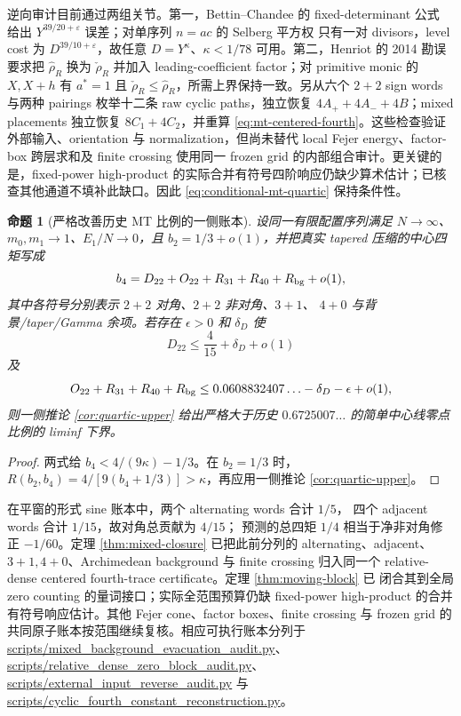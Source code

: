\documentclass[UTF8,11pt,a4paper]{ctexart}
\newtheorem{proposition}[theorem]{命题}
\theoremstyle{definition}
\theoremstyle{remark}
\newcommand{\eps}{\varepsilon}
\begin{document}
逆向审计目前通过两组关节。第一，Bettin--Chandee \cite[Corollary~1]{BettinChandee} 的 fixed-determinant
公式 给出 $Y^{39/20+\eps}$ 误差；对单序列 $n=ac$ 的 Selberg 平方权
只有一对 divisors，level cost 为 $D^{39/10+\eps}$，故任意
$D=Y^\kappa$、$\kappa<1/78$ 可用。第二，Henriot \cite{Henriot} 的 2014 勘误要求把
$\widehat\rho_R$ 换为 $\check\rho_R$ 并加入 leading-coefficient factor；对
primitive monic 的 $X,X+h$ 有 $a^*=1$ 且
$\check\rho_R\le\widehat\rho_R$，所需上界保持一致。另从六个 $2+2$ sign
words 与两种 pairings 枚举十二条 raw cyclic paths，独立恢复
$4A_++4A_-+4B$；mixed placements 独立恢复 $8C_1+4C_2$，并重算
\eqref{eq:mt-centered-fourth}。这些检查验证外部输入、orientation 与
normalization，但尚未替代 local Fejer energy、factor-box 跨层求和及 finite
crossing 使用同一 frozen grid 的内部组合审计。更关键的是，fixed-power high-product
的实际合并有符号四阶响应仍缺少算术估计；已核查其他通道不填补此缺口。因此
\eqref{eq:conditional-mt-quartic} 保持条件性。
\begin{proposition}[严格改善历史 MT 比例的一侧账本]\label{prop:fourth-ledger}
设同一有限配置序列满足 $N\to\infty$、$m_0,m_1\to1$、$E_1/N\to0$，且 $b_2=1/3+o(1)$，并把真实 tapered 压缩的中心四矩写成
\[
 b_4=D_{22}+O_{22}+R_{31}+R_{40}+R_{\rm bg}+o(1),
\]
其中各符号分别表示 $2+2$ 对角、$2+2$ 非对角、$3+1$、
$4+0$ 与背景/taper/Gamma 余项。若存在 $\epsilon>0$ 和 $\delta_D$ 使
\[
 D_{22}\le\frac4{15}+\delta_D+o(1)
\]
及
\[
 O_{22}+R_{31}+R_{40}+R_{\rm bg}
 \le0.0608832407\ldots-\delta_D-\epsilon+o(1),
\]
则一侧推论 \ref{cor:quartic-upper} 给出严格大于历史
$0.6725007\ldots$ 的简单中心线零点比例的 liminf 下界。
\end{proposition}

\begin{proof}
两式给
$b_4<4/(9\kappa)-1/3$。在 $b_2=1/3$ 时，
$R(b_2,b_4)=4/[9(b_4+1/3)]>\kappa$，再应用一侧推论
\ref{cor:quartic-upper}。
\end{proof}

在平窗的形式 sine 账本中，两个 alternating words 合计 $1/5$，
四个 adjacent words 合计 $1/15$，故对角总贡献为 $4/15$；
预测的总四矩 $1/4$ 相当于净非对角修正 $-1/60$。定理
\ref{thm:mixed-closure} 已把此前分列的 alternating、adjacent、
$3+1,4+0$、Archimedean background 与 finite crossing 归入同一个
relative-dense centered fourth-trace certificate。定理 \ref{thm:moving-block} 已
闭合其到全局 zero counting 的量词接口；实际全范围预算仍缺 fixed-power high-product 的合并有符号响应估计。其他 Fejer cone、factor boxes、finite crossing 与 frozen grid 的共同原子账本按范围继续复核。相应可执行账本分列于
\url{scripts/mixed_background_evacuation_audit.py}、
\url{scripts/relative_dense_zero_block_audit.py}、
\url{scripts/external_input_reverse_audit.py} 与
\url{scripts/cyclic_fourth_constant_reconstruction.py}。
\end{document}
